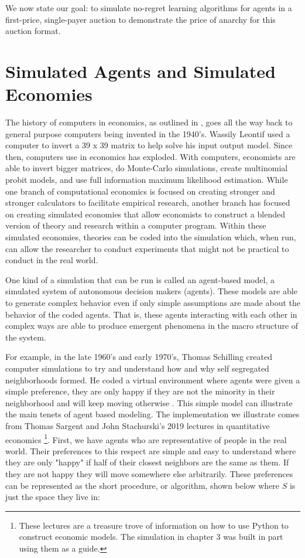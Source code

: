 \documentclass[12pt,twoside]{reedthesis}
\begin{document}
We now state our goal: to simulate no-regret learning algorithms for agents in a first-price, single-payer auction to demonstrate the price of anarchy for this auction format.

	
\section{Simulated Agents and Simulated Economies}
The history of computers in economics, as outlined in \citet{Backhouse2016}, goes all the way back to general purpose computers being invented in the 1940's. Wassily Leontif used a computer to invert a 39 x 39 matrix to help solve his input output model. Since then, computers use in economics has exploded. With computers, economists are able to invert bigger matrices, do Monte-Carlo simulations, create multinomial probit models, and use full information maximum likelihood estimation. While one branch of computational economics is focused on creating stronger and stronger calculators to facilitate empirical research, another branch has focused on creating simulated economies that allow economists to construct a blended version of theory and research within a computer program. Within these simulated economies, theories can be coded into the simulation which, when run, can allow the researcher to conduct experiments that might not be practical to conduct in the real world. 

One kind of a simulation that can be run is called an agent-based model, a simulated system of autonomous decision makers (agents). These models are able to generate complex behavior even if only simple assumptions are made about the behavior of the coded agents. That is, these agents interacting with each other in complex ways are able to produce emergent phenomena in the macro structure of the system.

For example, in the late 1960's and early 1970's, Thomas Schilling created computer simulations to try and understand how and why self segregated neighborhoods formed. He coded a virtual environment where agents were given a simple preference, they are only happy if they are not the minority in their neighborhood and will keep moving otherwise \citep{Schelling1969}. This simple model can illustrate the main tenets of agent based modeling. The implementation we illustrate comes from Thomas Sargent and John Stachurski's 2019 lectures in quantitative economics \footnote{These lectures are a treasure trove of information on how to use Python to construct economic models. The simulation in chapter 3 was built in part using them as a guide.}. First, we have agents who are representative of people in the real world. Their preferences to this respect are simple and easy to understand where they are only "happy" if half of their closest neighbors are the same as them. If they are not happy they will move somewhere else arbitrarily. These preferences can be represented as the short procedure, or algorithm, shown below where $S$ is just the space they live in:
\end{document}

